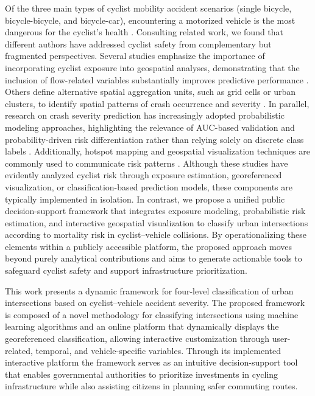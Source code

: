 \documentclass[preprint,12pt]{elsarticle}
\begin{document}
Of the three main types of cyclist mobility accident scenarios (single bicycle, bicycle-bicycle, and bicycle-car), encountering a motorized vehicle is the most dangerous for the cyclist's health \cite{Sumit2021}. 
Consulting related work, we found that different authors have addressed cyclist safety from complementary but fragmented perspectives. Several studies emphasize the importance of incorporating cyclist exposure into geospatial analyses, demonstrating that the inclusion of flow-related variables substantially improves predictive performance \cite{ferster_mapping_2021,kielhauser_identifying_2020,xue_integrating_2024}. 
Others define alternative spatial aggregation units, such as grid cells or urban clusters, to identify spatial patterns of crash occurrence and severity \cite{jaber_towards_2023,prencipe_injury_2025}. 
In parallel, research on crash severity prediction has increasingly adopted probabilistic modeling approaches, highlighting the relevance of AUC-based validation and probability-driven risk differentiation rather than relying solely on discrete class labels \cite{ali_advances_2024,schroter_determinants_2023,liu_mixed_2022,scarano_injury_2023,paul_critical_2025}. 
Additionally, hotspot mapping and geospatial visualization techniques are commonly used to communicate risk patterns \cite{ferster_mapping_2021,jaber_towards_2023,prencipe_injury_2025}. 
Although these studies have evidently analyzed cyclist risk through exposure estimation, georeferenced visualization, or classification-based prediction models, these components are typically implemented in isolation. In contrast, we propose a unified public decision-support framework that integrates exposure modeling, probabilistic risk estimation, and interactive geospatial visualization to classify urban intersections according to mortality risk in cyclist–vehicle collisions. By operationalizing these elements within a publicly accessible platform, the proposed approach moves beyond purely analytical contributions and aims to generate actionable tools to safeguard cyclist safety and support infrastructure prioritization.

This work presents a dynamic framework for four-level classification of urban intersections based on cyclist–vehicle accident severity. The proposed framework is composed of a novel methodology for classifying intersections using machine learning algorithms and an online platform that dynamically displays the georeferenced classification, allowing interactive customization through user-related, temporal, and vehicle-specific variables. Through its implemented interactive platform the framework serves as an intuitive decision-support tool that enables governmental authorities to prioritize investments in cycling infrastructure while also assisting citizens in planning safer commuting routes.
\end{document}
